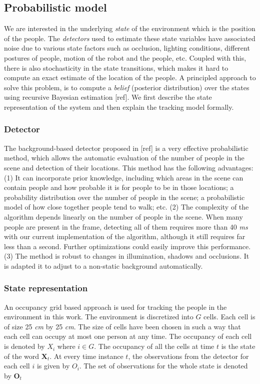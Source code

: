 \subsection{Probabilistic model}

We are interested in the underlying \textit{state} of the environment which is the position of the people. The \textit{detectors} used to estimate these state variables have associated noise due to various state factors such as occlusion, lighting conditions, different postures of people, motion of the robot and the people, etc. Coupled with this, there is also stochasticity in the state transitions, which makes it hard to compute an exact estimate of the location of the people. A principled approach to solve this problem, is to compute a \textit{belief} (posterior distribution) over the states using recursive Bayesian estimation [ref]. We first describe the state representation of the system and then explain the tracking model formally.

\subsubsection{Detector}
The background-based detector proposed in [ref] is a very effective probabilistic method, which allows the automatic evaluation of the number of people in the scene and detection of their locations. This method has the following advantages: (1) It can incorporate prior knowledge, including which areas in the scene can contain people and how probable it is for people to be in those locations; a probability distribution over the number of people in the scene; a probabilistic model of how close
together people tend to walk; etc. (2) The complexity of the algorithm depends linearly on the number of people in the scene. When many people are present in the frame, detecting all of them requires
more than 40 \textit{ms} with our current implementation of the algorithm, although it still requires far less than a second. Further optimizations could easily improve this performance. (3) The method is robust to changes in illumination, shadows and occlusions. It is adapted it to adjust to a non-static background automatically.

\subsubsection{State representation}

An occupancy grid based approach is used for tracking the people in the environment in this work. The environment is discretized into $G$ cells. Each cell is of size 25 \textit{cm} by 25 \textit{cm}. The size of cells have been chosen in such a way that each cell can occupy at most one person at any time. The occupancy of each cell is denoted by $X_{i}$ where $i \in G$. The occupancy of all the cells at time $t$ is the state of the word $\textbf{X}_{t}$. At every time instance $t$, the observations from the detector for each cell $i$ is given by $O_{i}$. The set of observations for the whole state is denoted by $\textbf{O}_{t}$ 

